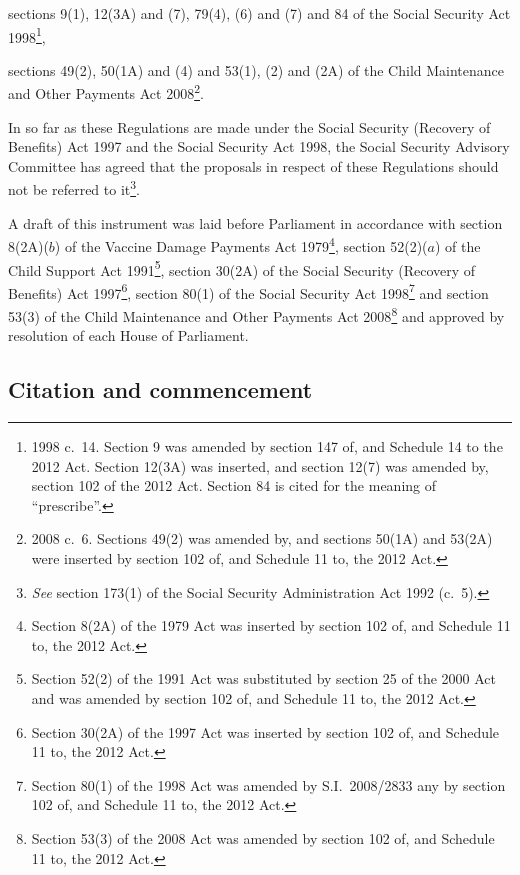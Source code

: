 \documentclass[12pt,a4paper]{article}
\begin{document}
\begin{enumerate}
    sections 9(1), 12(3A) and (7), 79(4), (6) and (7) and 84 of the Social Security Act 1998\footnote{1998 c.~14. Section 9 was amended by section 147 of, and Schedule 14 to the 2012 Act. Section 12(3A) was inserted, and section 12(7) was amended by, section 102 of the 2012 Act. Section 84 is cited for the meaning of “prescribe”.},

    sections 49(2), 50(1A) and (4) and 53(1), (2) and (2A) of the Child Maintenance and Other Payments Act 2008\footnote{2008 c.~6. Sections 49(2) was amended by, and sections 50(1A) and 53(2A) were inserted by section 102 of, and Schedule 11 to, the 2012 Act.}. 
\end{enumerate}

In so far as these Regulations are made under the Social Security (Recovery of Benefits) Act 1997 and the Social Security Act 1998, the Social Security Advisory Committee has agreed that the proposals in respect of these Regulations should not be referred to it\footnote{\emph{See} section 173(1) of the Social Security Administration Act 1992 (c.~5).}.

A draft of this instrument was laid before Parliament in accordance with section 8(2A)($b$)  of the Vaccine Damage Payments Act 1979\footnote{Section 8(2A) of the 1979 Act was inserted by section 102 of, and Schedule 11 to, the 2012 Act.}, section 52(2)($a$)  of the Child Support Act 1991\footnote{Section 52(2) of the 1991 Act was substituted by section 25 of the 2000 Act and was amended by section 102 of, and Schedule 11 to, the 2012 Act.}, section 30(2A) of the Social Security (Recovery of Benefits) Act 1997\footnote{Section 30(2A) of the 1997 Act was inserted by section 102 of, and Schedule 11 to, the 2012 Act.}, section 80(1) of the Social Security Act 1998\footnote{Section 80(1) of the 1998 Act was amended by S.I.~2008/2833 any by section 102 of, and Schedule 11 to, the 2012 Act.} and section 53(3) of the Child Maintenance and Other Payments Act 2008\footnote{Section 53(3) of the 2008 Act was amended by section 102 of, and Schedule 11 to, the 2012 Act.} and approved by resolution of each House of Parliament. 

{\sloppy

\tableofcontents

}

\bigskip

\setcounter{secnumdepth}{-2}

\subsection[1. Citation and commencement]{Citation and commencement}
\end{document}
